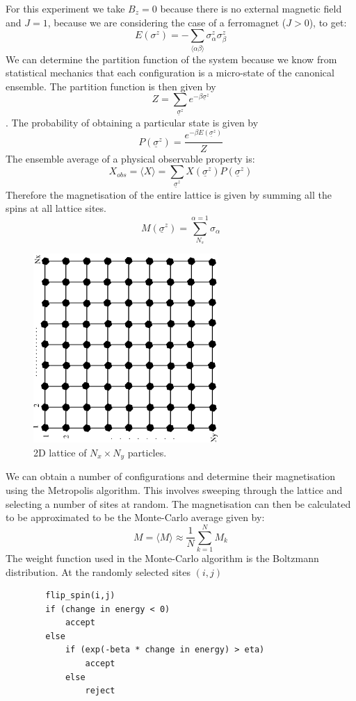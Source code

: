 \documentclass[a4paper]{IEEEtran}
\newcommand{\sz}{\underline{\sigma}^z}
\newcommand{\av}[1]{\langle #1 \rangle}
\begin{document}
    For this experiment we take $B_z = 0$ because there is no
    external magnetic field and $J = 1$, because we are considering
    the case of a ferromagnet ($J > 0$), to get:
    \[ E(\sigma^z) = -\sum_{\langle \alpha \beta \rangle} 
                      \sigma_{\alpha}^{z} \sigma_{\beta}^{z} \]
    We can determine the partition function of the system because we know
    from statistical mechanics that each configuration is a micro-state of
    the canonical ensemble. The partition function is then given by
    \[ Z = \sum_{\sz } e^{-\beta \sz } \] .
    The probability of obtaining a particular state is given by
    \[ P(\sz) = \frac{e^{-\beta E(\sz) }}{Z} \]
    The ensemble average of a physical observable property is:
    \[ X_{obs} = \langle X \rangle = \sum_{\sz} X(\sz) P(\sz) \]
    Therefore the magnetisation of the entire lattice is given
    by summing all the spins at all lattice sites.
    \[ M(\sz) = \sum_{N_s}^{\alpha = 1} \sigma_{\alpha} \]

    \begin{figure}[t]
        \caption{2D lattice of $N_x \times N_y$ particles. }
        \label{fig:grid}
        \begin{center}
            \includegraphics[angle=-90,width=7cm]{lattice.eps}
        \end{center}
    \end{figure} 
    
    We can obtain a number of configurations and determine their magnetisation
    using the Metropolis algorithm. This involves sweeping through the lattice
    and selecting a number of sites at random. The magnetisation can then
    be calculated to be approximated to be the Monte-Carlo average given
    by:
    \[ M = \av{M} \approx \frac{1}{N} \sum^{N}_{k=1} M_k \]
    The weight function used in the Monte-Carlo algorithm is the Boltzmann
    distribution.
    At the randomly selected sites $(i,j)$
    \begin{verbatim}
        flip_spin(i,j)
        if (change in energy < 0)
            accept
        else
            if (exp(-beta * change in energy) > eta)
                accept
            else
                reject
    \end{verbatim}
    
\end{document}
